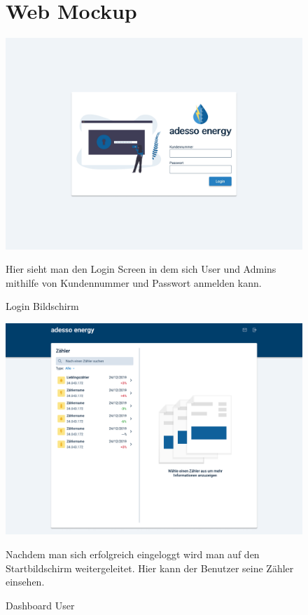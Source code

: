 
\newpage

\begin{figure}[h]
	\newpage
	\section{Web Mockup}
	\centering
    \includegraphics[scale=0.3]{img/WebsiteMockup/Login-User}
	\caption{Login Bildschirm} \hfill \break
	Hier sieht man den Login Screen in dem sich User und Admins mithilfe von Kundennummer und Passwort anmelden kann.
\end{figure}

\newpage

\begin{figure}[h]
	\centering
    \includegraphics[scale=0.3]{img/WebsiteMockup/Dashboard-User-NonSelected}
	\caption{Dashboard User} \hfill \break
	Nachdem man sich erfolgreich eingeloggt wird man auf den Startbildschirm weitergeleitet. Hier kann der Benutzer seine Zähler einsehen.
\end{figure}

